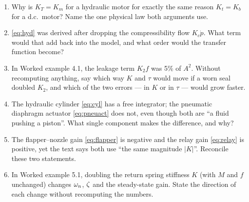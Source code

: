 \documentclass[11pt,a4paper]{article}
\begin{document}
\begin{enumerate}[leftmargin=2em,itemsep=2pt]
\item Why is $K_{T}=K_{m}$ for a hydraulic motor for exactly the same reason
      $K_{t}=K_{b}$ for a d.c.\ motor? Name the one physical law both
      arguments use.
\item \eqref{eq:hyd} was derived after dropping the compressibility flow
      $K_{c}\dot p$. What term would that add back into the model, and what
      order would the transfer function become?
\item In Worked example 4.1, the leakage term $K_{2}f$ was 5\% of $A^{2}$.
      Without recomputing anything, say which way $K$ and $\tau$ would move
      if a worn seal doubled $K_{2}$, and which of the two errors --- in $K$
      or in $\tau$ --- would grow faster.
\item The hydraulic cylinder \eqref{eq:cyl} has a free integrator; the
      pneumatic diaphragm actuator \eqref{eq:pneuact} does not, even though
      both are ``a fluid pushing a piston''. What single component makes the
      difference, and why?
\item The flapper--nozzle gain \eqref{eq:flapper} is negative and the relay
      gain \eqref{eq:relay} is positive, yet the text says both use ``the
      same magnitude $|K|$''. Reconcile these two statements.
\item In Worked example 5.1, doubling the return spring stiffness $K$ (with
      $M$ and $f$ unchanged) changes $\omega_{n}$, $\zeta$ and the steady-state gain.
      State the direction of each change without recomputing the numbers.
\end{enumerate}
\end{document}
